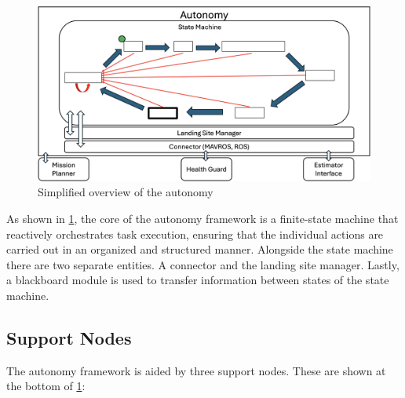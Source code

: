 \begin{figure}[ht!]
    \centering
    \includegraphics[scale=0.155]{images/system_overview/autonomy.png}
    \caption{Simplified overview of the autonomy}
    \label{fig:autonomy}
\end{figure}

As shown in \cref{fig:autonomy}, the core of the autonomy framework is a finite-state machine that reactively orchestrates task execution, ensuring that the individual actions are carried out in an organized and structured manner. Alongside the state machine there are two separate entities. A connector and the landing site manager. Lastly, a blackboard module is used to transfer information between states of the state machine.

\subsection{Support Nodes}\label{subsec:sup_nodes}

The autonomy framework is aided by three support nodes. These are shown at the bottom of \cref{fig:autonomy}:

